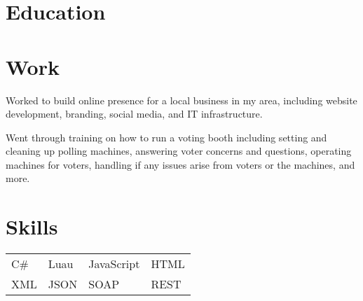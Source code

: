 \documentclass{my_cv}
\begin{document}

\section{Education}



\section{Work}

Worked to build online presence for a local business in my area, including website development, branding, social media, and IT infrastructure.

Went through training on how to run a voting booth including setting and cleaning up polling machines, answering voter concerns and questions, operating machines for voters, handling if any issues arise from voters or the machines, and more.

\section{Skills}
\begin{tabular}{l l l l}
C\# & Luau & JavaScript & HTML \\
XML & JSON & SOAP & REST
\end{tabular}
\end{document}
